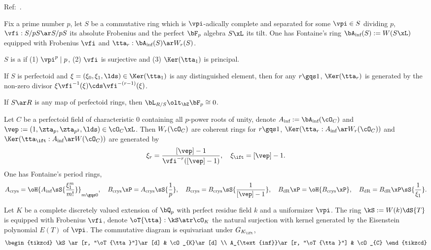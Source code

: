 \documentclass[a4paper, twoside]{article}
\begin{document}
\confighead{}{}{}


Ref:~\cite{BMS2018}.

\begin{stp}
	Fix a prime number $p$, let $S$ be a commutative ring which is $\vpi$-adically complete and separated for some $\vpi\in S$ dividing $p$, $\vfi:S/pS\ar S/pS$ its absolute Frobenius and the perfect $\bF_{p}$ algebra $S\xL$ its tilt. One has Fontaine's ring $\bA_{\text{inf}}(S):=W(S\xL)$ equipped with Frobenius $\vfi$ and $\tta_{r}:\bA_{\text{inf}}(S)\ar W_{r}(S)$.

\end{stp}

\begin{dfn}
	$S$ is a  if (1) $\vpi^{p}\mid p$, (2) $\vfi$ is surjective and (3) $\Ker(\tta_{1})$ is principal.
\end{dfn}

\begin{thm}
	If $S$ is perfectoid and $\xi=(\xi_{0},\xi_{1},\lds)\in\Ker(\tta_{1})$ is any distinguished element, then for any $r\gqs1$, $\Ker(\tta_{r})$ is generated by the non-zero divisor $\xi\vfi^{-1}(\xi)\cds\vfi^{-(r-1)}(\xi)$.

	If $S\ar R$ is any map of perfectoid rings, then $\bL_{R/S}\olt_{\bZ}\bF_{p}\cong0$.
\end{thm}

\begin{thm}
	Let $C$ be a perfectoid field of characteristic $0$ containing all $p$-power roots of unity, denote $A_{\text{inf}}:=\bA_{\text{inf}}(\cO_{C})$ and $\vep:=(1,\zta_{p},\zta_{p^{2}},\lds)\in\cO_{C}\xL$. Then $W_{r}(\cO_{C})$ are coherent rings for $r\gqs1$, $\Ker(\tta_{r}:A_{\text{inf}}\ar W_{r}(\cO_{C}))$ and $\Ker(\tta_{\ift}:A_{\text{inf}}\ar W(\cO_{C}))$ are generated by
	\[
		\xi_{r}=\frac{[\vep]-1}{\vfi^{-r}([\vep]-1)},\quad\xi_{\ift}=[\vep]-1.
	\]
	One has Fontaine's period rings,
	\[
		A_{\text{crys}}=\oH{A_{\text{inf}}\sS{\frac{\xi_{1}^{m}}{m!}}}_{m\gqs0},\quad B_{\text{crys}}\xP=A_{\text{crys}}\sS{\frac{1}{p}},\quad B_{\text{crys}}=B_{\text{crys}}\sS{\frac{1}{[\vep]-1}},\quad B_{\text{dR}}\xP=\oH{B_{\text{crys}}\xP},\quad B_{\text{dR}}=B_{\text{dR}}\xP\sS{\frac{1}{\xi_{1}}}.
	\]
\end{thm}


\begin{stp}
	Let $K$ be a complete discretely valued extension of $\bQ_{p}$ with perfect residue field $k$ and a uniformizer $\vpi$. The ring $\kS:=W(k)\dS{T}$ is equipped with Frobenius $\vfi$, denote $\oT{\tta}:\kS\atr\cO_{K}$ the natural surjection with kernel generated by the Eisenstein polynomial $E(T)$ of $\vpi$. The commutative diagram is equivariant under $G_{K_{\ift}}$,
	\[
		\begin{tikzcd}
			\kS\ar[r, "\oT{\tta}"]\ar[d] & \cO_{K}\ar[d] \\
			A_{\text{inf}}\ar[r, "\oT{\tta}"] & \cO_{C}
		\end{tikzcd}
	\]
\end{stp}
\end{document}
